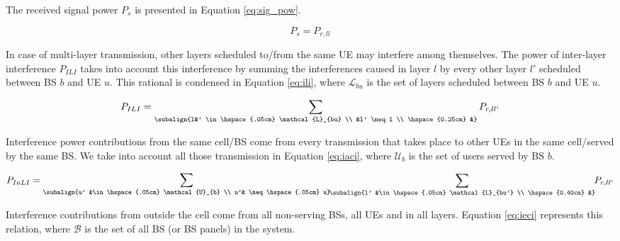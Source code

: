 The received signal power $P_s$ is presented in Equation \eqref{eq:sig_pow}.

\begin{equation} \label{eq:sig_pow}
    P_s = P_{r, ll} 
\end{equation}


In case of multi-layer transmission, other layers scheduled to/from the same UE may interfere among themselves. The power of inter-layer interference $P_{ILI}$ takes into account this interference by summing the interferences caused in layer $l$ by every other layer $l'$ scheduled between BS $b$ and UE $u$. This rational is condensed in Equation \eqref{eq:ili}, where $\mathcal{L}_{bu}$ is the set of layers scheduled between BS $b$ and UE $u$.

\begin{equation} \label{eq:ili}
    P_{ILI} = \sum_{\subalign{l&' \in \hspace{.05cm} \mathcal{L}_{bu} \\ &l' \neq l \\ \hspace{0.25cm} &}} P_{r, ll'} 
\end{equation}


Interference power contributions from the same cell/BS come from every transmission that takes place to other UEs in the same cell/served by the same BS. We take into account all those transmission in Equation \eqref{eq:iaci}, where $\mathcal{U}_{b}$ is the set of users served by BS $b$.

\begin{equation} \label{eq:iaci}
    P_{IaLI} = \mathlarger{\sum}_{\subalign{u' &\in \hspace{.05cm} \mathcal{U}_{b} \\ u'& \neq \hspace{.05cm} u}} \hspace{-0.1cm} \sum_{\subalign{l' &\in \hspace{.05cm} \mathcal{L}_{bu'} \\ \hspace{0.40cm} &}} \hspace{-0.1cm} P_{r, ll'} 
\end{equation}

Interference contributions from outside the cell come from all non-serving BSs, all UEs and in all layers. Equation \eqref{eq:ieci} represents this relation, where $\mathcal{B}$ is the set of all BS (or BS panels) in the system.

